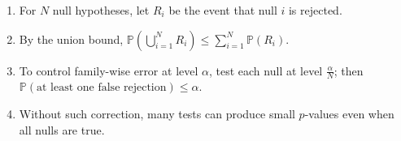 \begin{method} \label{prin:fishing-expeditions-and-bonferroni} 
\begin{enumerate}[label=(\roman*)]
\setlength{\itemsep}{0pt}
\item For $N$ null hypotheses, let $R_i$ be the event that null $i$ is rejected.
\item By the union bound, $\mathbb{P}(\bigcup\limits_{i=1}^{N}R_i)\leq\sum\limits_{i=1}^{N}\mathbb{P}(R_i)$.
\item To control family-wise error at level $\alpha$, test each null at level $\frac{\alpha}{N}$; then $\mathbb{P}(\text{at least one false rejection})\leq\alpha$.
\item Without such correction, many tests can produce small $p$-values even when all nulls are true.
\end{enumerate}
\end{method}
